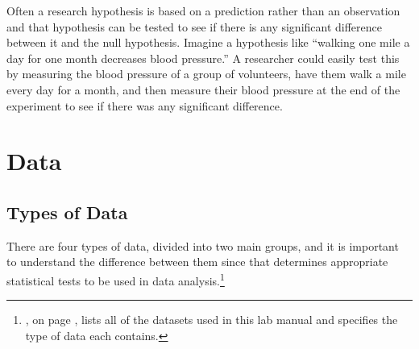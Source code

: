 Often a research hypothesis is based on a prediction rather than an observation and that hypothesis can be tested to see if there is any significant difference between it and the null hypothesis. Imagine a hypothesis like ``walking one mile a day for one month decreases blood pressure.'' A researcher could easily test this by measuring the blood pressure of a group of volunteers, have them walk a mile every day for a month, and then measure their blood pressure at the end of the experiment to see if there was any significant difference.

\section{Data}\label{intro:TypesOfData}

\subsection{Types of Data}

There are four types of data, divided into two main groups, and it is important to understand the difference between them since that determines appropriate statistical tests to be used in data analysis.\footnote{, on page \pageref{app:a}, lists all of the datasets used in this lab manual and specifies the type of data each contains.}

